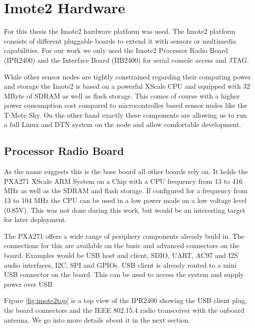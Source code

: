 \chapter{Imote2 Hardware}
For this thesis the Imote2 hardware platform was used. The Imote2 platform
consists of different pluggable boards to extend it with sensors or multimedia
capabilities. For our work we only used the Imote2 Processor Radio Board
(IPR2400) and the Interface Board (IIB2400) for serial console access and JTAG.

While other sensor nodes are tightly constrained regarding their computing power
and storage the Imote2 is based on a powerful XScale CPU and equipped with 32
MByte of SDRAM as well as flash storage. This comes of course with a higher power
consumption cost compared to microcontroller based sensor nodes like the T-Mote
Sky. On the other hand exactly these components are allowing us to run a full
Linux and DTN system on the node and allow comfortable development.

\section{Processor Radio Board}
As the name suggests this is the base board all other boards rely on. It holds
the PXA271 XScale ARM System on a Chip with a CPU frequency from 13 to 416 MHz
as well as the SDRAM and flash storage. If configured for a frequency from 13
to 104 MHz the CPU can be used in a low power mode on a low voltage level
(0.85V). This was not done during this work, but would be an interesting target
for later deployment.

The PXA271 offers a wide range of periphery components already build in. The
connections for this are available on the basic and advanced connectors on the
board. Examples would be USB host and client, SDIO, UART, AC97 and I2S audio
interfaces, I2C, SPI and GPIOs. USB client is already routed to a mini USB
connector on the board. This can be used to access the system and supply power
over USB.

Figure \ref{fig:imote2top} is a top view of the IPR2400 showing the USB client plug,
the board connectors and the IEEE 802.15.4 radio transceiver with the onboard
antenna. We go into more details about it in the next section.

